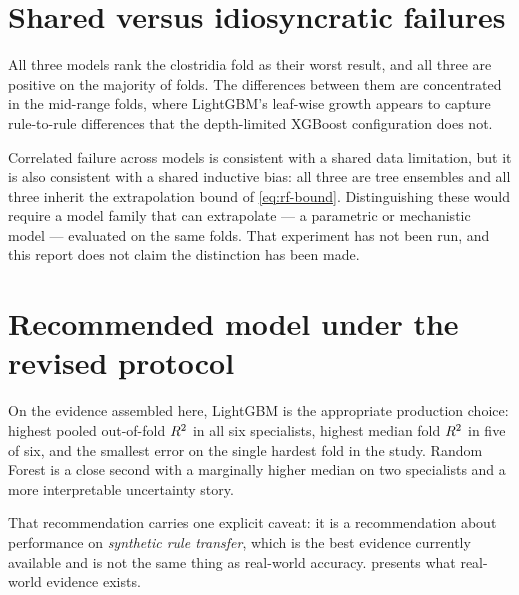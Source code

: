 \section{Shared versus idiosyncratic failures}


All three models rank the clostridia fold as their worst result, and all
three are positive on the majority of folds. The differences between them
are concentrated in the mid-range folds, where LightGBM's leaf-wise growth
appears to capture rule-to-rule differences that the depth-limited XGBoost
configuration does not.

\begin{limitbox}[title=A caution about attributing correlated errors]
Correlated failure across models is consistent with a shared data
limitation, but it is also consistent with a shared inductive bias: all
three are tree ensembles and all three inherit the extrapolation bound of
\cref{eq:rf-bound}. Distinguishing these would require a model family that
can extrapolate --- a parametric or mechanistic model --- evaluated on the
same folds. That experiment has not been run, and this report does not
claim the distinction has been made.
\end{limitbox}

\section{Recommended model under the revised protocol}

On the evidence assembled here, LightGBM is the appropriate production
choice: highest pooled out-of-fold $R^2$ in all six specialists, highest
median fold $R^2$ in five of six, and the smallest error on the single
hardest fold in the study. Random Forest is a close second with a
marginally higher median on two specialists and a more interpretable
uncertainty story.

That recommendation carries one explicit caveat: it is a recommendation
about performance on \emph{synthetic rule transfer}, which is the best
evidence currently available and is not the same thing as real-world
accuracy.  presents what real-world evidence exists.
